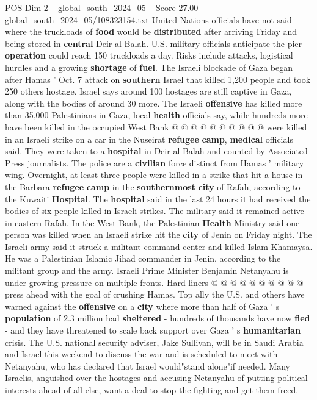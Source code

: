 \begin{textsample}{POS Dim 2 – global\_south\_2024\_05 – Score 27.00 – global\_south\_2024\_05/108323154.txt}
United Nations officials have not said where the truckloads of \textbf{food} would be \textbf{distributed} after arriving Friday and being stored in \textbf{central} Deir al-Balah.
U.S. military officials anticipate the pier \textbf{operation} could reach 150 truckloads a day.
Risks include attacks, logistical hurdles and a growing \textbf{shortage} of \textbf{fuel}.
The Israeli blockade of Gaza began after Hamas ' Oct. 7 attack on \textbf{southern} Israel that killed 1,200 people and took 250 others hostage.
Israel says around 100 hostages are still captive in Gaza, along with the bodies of around 30 more.
The Israeli \textbf{offensive} has killed more than 35,000 Palestinians in Gaza, local \textbf{health} officials say, while hundreds more have been killed in the occupied West Bank @ @ @ @ @ @ @ @ @ @ were killed in an Israeli strike on a car in the Nuseirat \textbf{refugee} \textbf{camp}, \textbf{medical} officials said.
They were taken to a \textbf{hospital} in Deir al-Balah and counted by Associated Press journalists.
The police are a \textbf{civilian} force distinct from Hamas ' military wing.
Overnight, at least three people were killed in a strike that hit a house in the Barbara \textbf{refugee} \textbf{camp} in the \textbf{southernmost} \textbf{city} of Rafah, according to the Kuwaiti \textbf{Hospital}.
The \textbf{hospital} said in the last 24 hours it had received the bodies of six people killed in Israeli strikes.
The military said it remained active in eastern Rafah.
In the West Bank, the Palestinian \textbf{Health} Ministry said one person was killed when an Israeli strike hit the \textbf{city} of Jenin on Friday night.
The Israeli army said it struck a militant command center and killed Islam Khamaysa.
He was a Palestinian Islamic Jihad commander in Jenin, according to the militant group and the army.
Israeli Prime Minister Benjamin Netanyahu is under growing pressure on multiple fronts.
Hard-liners @ @ @ @ @ @ @ @ @ @ press ahead with the goal of crushing Hamas.
Top ally the U.S. and others have warned against the \textbf{offensive} on a \textbf{city} where more than half of Gaza ' s \textbf{population} of 2.3 million had \textbf{sheltered} - hundreds of thousands have now \textbf{fled} - and they have threatened to scale back support over Gaza ' s \textbf{humanitarian} crisis.
The U.S. national security adviser, Jake Sullivan, will be in Saudi Arabia and Israel this weekend to discuss the war and is scheduled to meet with Netanyahu, who has declared that Israel would"stand alone"if needed.
Many Israelis, anguished over the hostages and accusing Netanyahu of putting political interests ahead of all else, want a deal to stop the fighting and get them freed.

\end{textsample}
